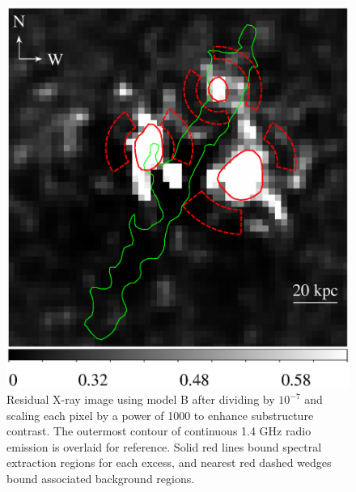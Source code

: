 \begin{figure}
  \begin{center}
    \begin{minipage}{0.5\linewidth}
      \includegraphics*[width=\textwidth]{exspec.ps}
    \end{minipage}
    \caption{Residual X-ray image using model B after dividing by
      $10^{-7}$ and scaling each pixel by a power of 1000 to enhance
      substructure contrast. The outermost contour of continuous 1.4
      GHz radio emission is overlaid for reference. Solid red lines
      bound spectral extraction regions for each excess, and nearest
      red dashed wedges bound associated background regions.}
    \label{fig:exspec}
  \end{center}
\end{figure}

